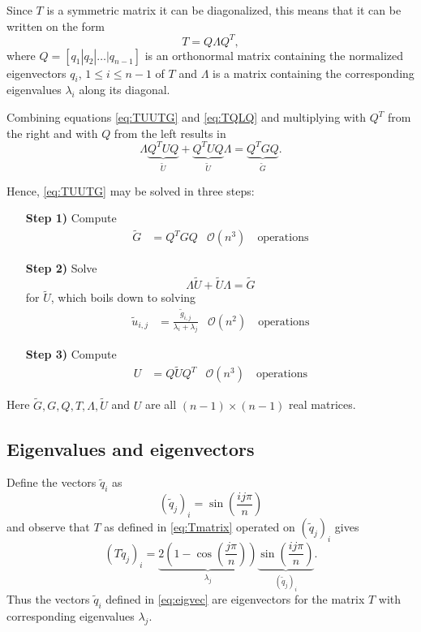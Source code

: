 \documentclass[11pt,a4paper,english]{article}
\numberwithin{figure}{subsection}
\numberwithin{table}{subsection}
\begin{document}
Since $T$ is a symmetric matrix it can be diagonalized, this means that it can be written on the form
\begin{equation}
	\label{eq:TQLQ}
	T = Q\Lambda Q^T,
\end{equation}
where $Q=[q_1|q_2|\dots|q_{n-1}]$ is an orthonormal matrix containing the normalized eigenvectors $q_i$, $1\leq i \leq n-1$ of $T$ and $\Lambda$ is a matrix containing the corresponding eigenvalues $\lambda_i$ along its diagonal.

Combining equations \eqref{eq:TUUTG} and \eqref{eq:TQLQ} and multiplying with $Q^T$ from the right and with $Q$ from the left results in
\begin{equation}
	\Lambda \underbrace{Q^TUQ}_{\widetilde{U}} + \underbrace{Q^TUQ}_{\widetilde{U}}\Lambda = \underbrace{Q^TGQ}_{\widetilde{G}}.
\end{equation}

Hence, \eqref{eq:TUUTG} may be solved in three steps:
\begin{enumerate}
	\item[\textbf{Step 1)}]	Compute 
		\begin{align*}
			\widetilde{G} &= Q^TGQ &\mathcal{O}(n^3) \quad\text{operations}
		\end{align*}
	\item[\textbf{Step 2)}]	Solve 
		\begin{equation*}
			\Lambda\widetilde{U}+\widetilde{U}\Lambda = \widetilde{G}
		\end{equation*}
							for $\widetilde{U}$, which boils down to solving 
		\begin{align*}
			\widetilde{u}_{i,j} &= \frac{\widetilde{g}_{i,j}}{\lambda_i + \lambda_j} &\mathcal{O}(n^2) \quad\text{operations}
		\end{align*}
	\item[\textbf{Step 3)}]	Compute 
		\begin{align*}
			U &= Q\widetilde{U}Q^T &\mathcal{O}(n^3) \quad\text{operations}
		\end{align*}			
\end{enumerate}
Here $\widetilde{G},G,Q,T,\Lambda,\widetilde{U}$ and $U$ are all $(n-1)\times(n-1)$ real matrices.

\subsection{Eigenvalues and eigenvectors}
Define the vectors $\widetilde{q}_i$ as
\begin{equation}
	\label{eq:eigvec}
	(\widetilde{q}_j)_i = \sin\left(\frac{ij\pi}{n}\right)
\end{equation}
and observe that $T$ as defined in \eqref{eq:Tmatrix} operated on $(\widetilde{q}_j)_i$ gives
\begin{equation}
	(T\widetilde{q}_j)_i = \underbrace{2\left(1-\cos\left(\frac{j\pi}{n}\right)\right)}_{\lambda_j}\underbrace{\sin\left(\frac{ij\pi}{n}\right)}_{(\widetilde{q}_j)_i}.
\end{equation}
Thus the vectors $\widetilde{q}_i$ defined in \eqref{eq:eigvec} are eigenvectors for the matrix $T$ with corresponding eigenvalues $\lambda_j$.
\end{document}
